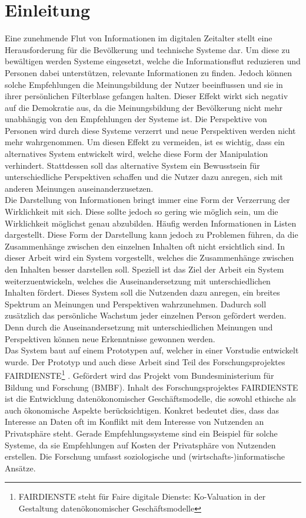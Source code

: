 \section{Einleitung}
Eine zunehmende Flut von Informationen im digitalen Zeitalter stellt eine Herausforderung für die Bevölkerung und technische Systeme dar.
Um diese zu bewältigen werden Systeme eingesetzt, welche die Informationsflut reduzieren und Personen dabei unterstützen, relevante Informationen zu finden.
Jedoch können solche Empfehlungen die Meinungsbildung der Nutzer beeinflussen und sie in ihrer persönlichen Filterblase gefangen halten.
Dieser Effekt wirkt sich negativ auf die Demokratie aus, da die Meinungsbildung der Bevölkerung nicht mehr unabhängig von den Empfehlungen der Systeme ist.
Die Perspektive von Personen wird durch diese Systeme verzerrt und neue Perspektiven werden nicht mehr wahrgenommen.
Um diesen Effekt zu vermeiden, ist es wichtig, dass ein alternatives System entwickelt wird, welche diese Form der Manipulation verhindert.
Stattdessen soll das alternative System ein Bewusstsein für unterschiedliche Perspektiven schaffen und die Nutzer dazu anregen, sich mit anderen Meinungen auseinanderzusetzen. \\

Die Darstellung von Informationen bringt immer eine Form der Verzerrung der Wirklichkeit mit sich.
Diese sollte jedoch so gering wie möglich sein, um die Wirklichkeit möglichst genau abzubilden.
Häufig werden Informationen in Listen dargestellt.
Diese Form der Darstellung kann jedoch zu Problemen führen, da die Zusammenhänge zwischen den einzelnen Inhalten oft nicht ersichtlich sind.
In dieser Arbeit wird ein System vorgestellt, welches die Zusammenhänge zwischen den Inhalten besser darstellen soll.
Speziell ist das Ziel der Arbeit ein System weiterzuentwickeln, welches die Auseinandersetzung mit unterschiedlichen Inhalten fördert.
Dieses System soll die Nutzenden dazu anregen, ein breites Spektrum an Meinungen und Perspektiven wahrzunehmen.
Dadurch soll zusätzlich das persönliche Wachstum jeder einzelnen Person gefördert werden.
Denn durch die Auseinandersetzung mit unterschiedlichen Meinungen und Perspektiven können neue Erkenntnisse gewonnen werden. \\

Das System baut auf einem Prototypen auf, welcher in einer Vorstudie entwickelt wurde.
Der Prototyp und auch diese Arbeit sind Teil des Forschungsprojektes FAIRDIENSTE\footnote{FAIRDIENSTE steht für \glqq Faire digitale Dienste: Ko-Valuation in der Gestaltung datenökonomischer Geschäftsmodelle\grqq{}} \cite{fairdienste}.
Gefördert wird das Projekt vom Bundesministerium für Bildung und Forschung (BMBF).
Inhalt des Forschungsprojektes FAIRDIENSTE ist die Entwicklung datenökonomischer Geschäftsmodelle, die sowohl ethische als auch ökonomische Aspekte berücksichtigen.
Konkret bedeutet dies, dass das Interesse an Daten oft im Konflikt mit dem Interesse von Nutzenden an Privatsphäre steht.
Gerade Empfehlungssysteme sind ein Beispiel für solche Systeme, da sie Empfehlungen auf Kosten der Privatsphäre von Nutzenden erstellen.
Die Forschung umfasst soziologische und (wirtschafts-)informatische Ansätze. \\

